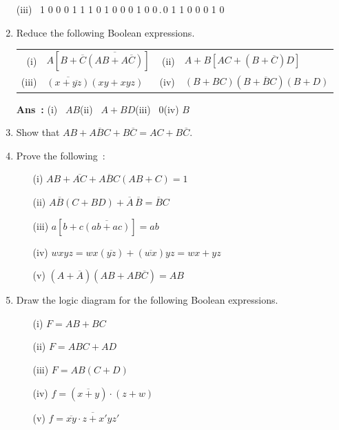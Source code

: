 \begin{enumerate}
\qquad (iii)~ 1 0 0 0 1 1 1 0 1 0 0 0 1 0 0\,.\,0 1 1 0 0 0 1 0

\item Reduce the following Boolean expressions.

\smallskip
\begin{tabular}{r@{\;}l@{\qquad}r@{\;}l}
(i) & $A[B+\overline{C}\overline{(AB+A\overline{C})}]$ & (ii) & $A+B[AC+(B+\overline{C})D]$\\[4pt]
(iii) & $\overline{(x+\overline{yz})}(xy+xyz)$ & (iv) & $(B+BC)(B+\overline{B}C)(B+D)$
\end{tabular}

\smallskip
\noindent
{\bf Ans~:} (i)~ $AB$\qquad (ii)~ $A + BD$\qquad (iii)~ 0\qquad (iv) $B$

\item Show that $AB+A\overline{B}C+B\overline{C}=AC+B\overline{C}$.

\item Prove the following~:
\begin{itemize}
\item[(i)]  $AB+\overline{AC}+A\overline{B}C(AB+C)=1$

\item[(ii)] $A\overline{B}(C+BD)+\overline{A}\,\overline{B}=\overline{B}C$

\item[(iii)] $a[b+c\overline{(ab+ac)}]=ab$

\item[(iv)] $wxyz=wx(\overline{yz})+(\overline{wx})yz=wx+yz$

\item[(v)] $(A+\overline{A})(AB+AB\overline{C})=AB$
\end{itemize}

\item Draw the logic diagram for the following Boolean expressions.
\begin{itemize}
\item[(i)] $F=AB+BC$

\item[(ii)] $F=ABC+AD$

\item[(iii)] $F=AB(C+D)$

\item[(iv)] $f=(\overline{x+y})\cdot (z+w)$

\item[(v)] $f=\overline{\overline{xy}\cdot z+x'yz'}$
\end{itemize}


\end{enumerate}
